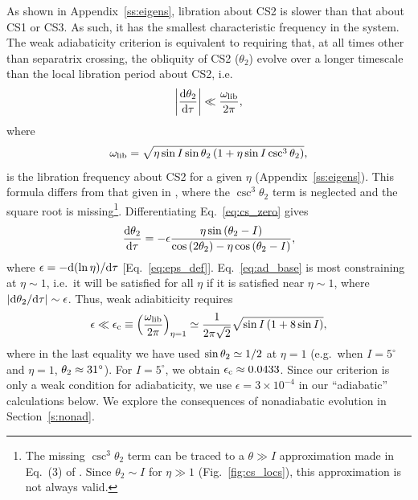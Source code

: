 As shown in Appendix~\ref{ss:eigens}, libration about CS2 is slower than that
about CS1 or CS3. As such, it has the smallest characteristic frequency in the
system. The weak adiabaticity criterion is equivalent to
requiring that, at all times other than separatrix crossing, the obliquity of
CS2 ($\theta_2$) evolve over a longer timescale than the local libration period
about CS2, i.e.
\begin{equation}
    \abs{\rd{\theta_2}{\tau}} \ll
        \frac{\omega_{\rm lib}}{2\pi},\label{eq:ad_base}
\end{equation}
where
\begin{equation}
    \omega_{\rm lib} = \sqrt{\eta\sin I \sin \theta_2
        \p{1 + \eta \sin I \csc^3 \theta_2}},\label{eq:w_lib}
\end{equation}
is the libration frequency about CS2 for a given $\eta$
(Appendix~\ref{ss:eigens}). This formula differs from that given in
\citet{millholland_disk}, where the $\csc^3\!\theta_2$ term is neglected and the
square root is missing\footnote{The missing $\csc^3\!\theta_2$ term can be
traced to a $\theta \gg I$ approximation made in Eq.~(3) of \citet{ward2004II}.
Since $\theta_2 \sim I$ for $\eta \gg 1$ (Fig.~\ref{fig:cs_locs}), this
approximation is not always valid.}. Differentiating Eq.~\eqref{eq:cs_zero}
gives
\begin{equation}
    \rd{\theta_2}{\tau} = -\epsilon \frac{\eta \sin\p{\theta_2 - I}}{
        \cos\p{2\theta_2} - \eta \cos\p{\theta_2 - I}},\label{eq:dq2dt}
\end{equation}
where $\epsilon = -\mathrm{d}(\ln \eta) / \mathrm{d}\tau$ [Eq.~\eqref{eq:eps_def}].
Eq.~\eqref{eq:ad_base} is most constraining at $\eta \sim 1$, i.e.\ it will be
satisfied for all $\eta$ if it is satisfied near $\eta \sim 1$, where
$\left|\mathrm{d}\theta_2 / \mathrm{d}\tau\right| \sim \epsilon$. Thus, weak adiabiticity requires
\begin{equation}
    \epsilon \ll \epsilon_{\rm c}
        \equiv \p{\frac{\omega_{\rm lib}}{2\pi}}_{\eta = 1}
            \simeq \frac{1}{2\pi\sqrt{2}}\sqrt{\sin I\p{1 + 8\sin I}},
            \label{eq:ad_constr}
\end{equation}
where in the last equality we have used $\sin \theta_{\rm 2} \simeq 1/2$ at
$\eta = 1$ (e.g.\ when $I = 5^\circ$ and $\eta = 1$, $\theta_{\rm 2} \approx
31^\circ$). For $I = 5^\circ$, we obtain $\epsilon_{\rm c} \approx 0.0433$.
Since our criterion is only a weak condition for adiabaticity, we use $\epsilon
= 3 \times 10^{-4}$ in our ``adiabatic'' calculations below. We explore the
consequences of nonadiabatic evolution in Section~\ref{s:nonad}.

